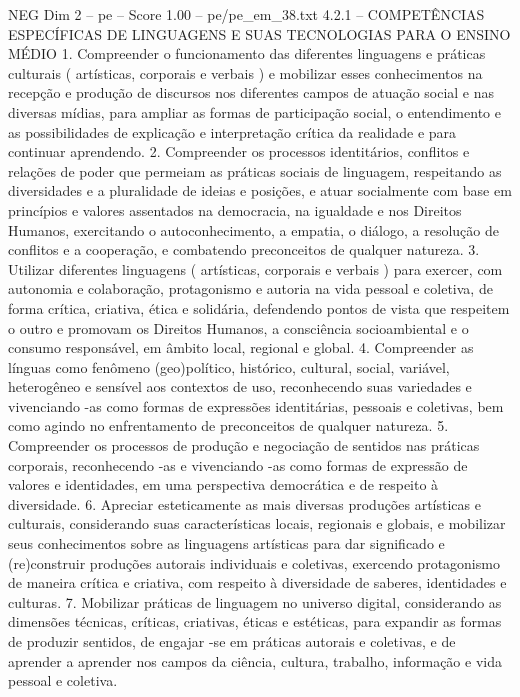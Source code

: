 \begin{textsample}{NEG Dim 2 – pe – Score 1.00 – pe/pe\_em\_38.txt}  \label{ex:f2_neg_039}
4.2.1 – COMPETÊNCIAS ESPECÍFICAS DE LINGUAGENS E SUAS TECNOLOGIAS PARA O ENSINO MÉDIO 1.
Compreender o funcionamento das diferentes linguagens e práticas culturais ( artísticas, corporais e verbais ) e mobilizar esses conhecimentos na recepção e produção de discursos nos diferentes campos de atuação social e nas diversas mídias, para ampliar as formas de participação social, o entendimento e as possibilidades de explicação e interpretação crítica da realidade e para continuar aprendendo. 2.
Compreender os processos identitários, conflitos e relações de poder que permeiam as práticas sociais de linguagem, respeitando as diversidades e a pluralidade de ideias e posições, e atuar socialmente com base em princípios e valores assentados na democracia, na igualdade e nos Direitos Humanos, exercitando o autoconhecimento, a empatia, o diálogo, a resolução de conflitos e a cooperação, e combatendo preconceitos de qualquer natureza. 3.
Utilizar diferentes linguagens ( artísticas, corporais e verbais ) para exercer, com autonomia e colaboração, protagonismo e autoria na vida pessoal e coletiva, de forma crítica, criativa, ética e solidária, defendendo pontos de vista que respeitem o outro e promovam os Direitos Humanos, a consciência socioambiental e o consumo responsável, em âmbito local, regional e global. 4.
Compreender as línguas como fenômeno (geo)político, histórico, cultural, social, variável, heterogêneo e sensível aos contextos de uso, reconhecendo suas variedades e vivenciando -as como formas de expressões identitárias, pessoais e coletivas, bem como agindo no enfrentamento de preconceitos de qualquer natureza. 5.
Compreender os processos de produção e negociação de sentidos nas práticas corporais, reconhecendo -as e vivenciando -as como formas de expressão de valores e identidades, em uma perspectiva democrática e de respeito à diversidade. 6.
Apreciar esteticamente as mais diversas produções artísticas e culturais, considerando suas características locais, regionais e globais, e mobilizar seus conhecimentos sobre as linguagens artísticas para dar significado e (re)construir produções autorais individuais e coletivas, exercendo protagonismo de maneira crítica e criativa, com respeito à diversidade de saberes, identidades e culturas. 7.
Mobilizar práticas de linguagem no universo digital, considerando as dimensões técnicas, críticas, criativas, éticas e estéticas, para expandir as formas de produzir sentidos, de engajar -se em práticas autorais e coletivas, e de aprender a aprender nos campos da ciência, cultura, trabalho, informação e vida pessoal e coletiva.

\end{textsample}

